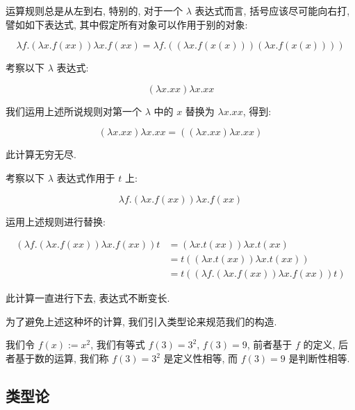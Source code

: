 \begin{remark}
    运算规则总是从左到右, 特别的, 对于一个 \(\lambda\) 表达式而言, 括号应该尽可能向右打,
    譬如如下表达式, 其中假定所有对象可以作用于别的对象:

    \[
        \lambda f.(\lambda x.f(xx)) \lambda x.f(xx) = \lambda f.((\lambda x.f(x(x))) (\lambda x.f(x(x))))
    \]
\end{remark}

\begin{example}[Russell 悖论]
    考察以下 \(\lambda\) 表达式:

    \[
        (\lambda x.xx) \lambda x.xx
    \]

    我们运用上述所说规则对第一个 \(\lambda\) 中的 \(x\) 替换为 \(\lambda x.xx\), 得到:

    \[
        (\lambda x.xx) \lambda x.xx = ((\lambda x.xx) \lambda x.xx)
    \]

    此计算无穷无尽.
\end{example}

\begin{example}
    考察以下 \(\lambda\) 表达式作用于 \(t\) 上:

    \[
        \lambda f.(\lambda x.f(xx)) \lambda x.f(xx)
    \]

    运用上述规则进行替换:

    \[
        \begin{aligned}
            (\lambda f.(\lambda x.f(xx)) \lambda x.f(xx)) t &= (\lambda x.t(xx)) \lambda x.t(xx) \\
            &= t ((\lambda x.t(xx)) \lambda x.t(xx)) \\
            &= t ((\lambda f.(\lambda x.f(xx)) \lambda x.f(xx)) t)
        \end{aligned}
    \]

    此计算一直进行下去, 表达式不断变长.
\end{example}

为了避免上述这种坏的计算, 我们引入类型论来规范我们的构造.

我们令 \(f(x) := x^2\), 我们有等式 \(f(3) = 3^2\), \(f(3) = 9\),
前者基于 \(f\) 的定义, 后者基于数的运算, 我们称 \(f(3) = 3^2\) 是定义性相等,
而 \(f(3) = 9\) 是判断性相等.

\subsection{类型论}


